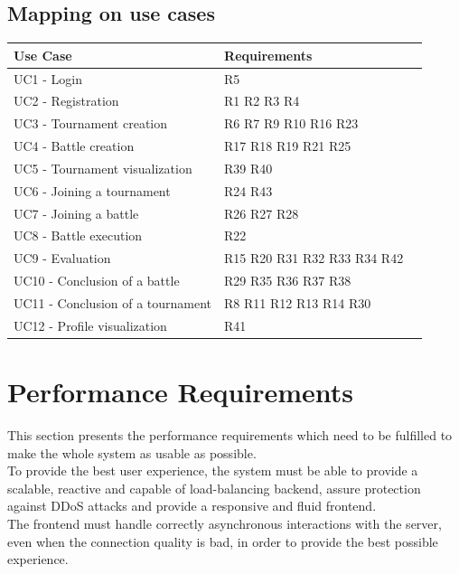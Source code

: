 \clearpage
\subsection{Mapping on use cases}
\begin{table}[H]
    \begin{tabularx}{\textwidth}{XXX}
        \toprule
        \textbf{Use Case}                     & \textbf{Requirements} \\ \midrule
        UC1 - Login                           & R5                   \\
        UC2 - Registration                    & R1 R2 R3 R4               \\
        UC3 - Tournament creation             & R6 R7 R9 R10 R16 R23  \\
        UC4 - Battle creation                 & R17 R18 R19 R21 R25       \\
        UC5 - Tournament visualization        & R39 R40          \\
        UC6 - Joining a tournament            & R24 R43        \\
        UC7 - Joining a battle                & R26 R27 R28      \\
        UC8 - Battle execution                & R22              \\
        UC9 - Evaluation                      & R15 R20 R31 R32 R33 R34 R42     \\
        UC10 - Conclusion of a battle         & R29 R35 R36 R37 R38         \\
        UC11 - Conclusion of a tournament     & R8 R11 R12 R13 R14 R30              \\
        UC12 - Profile visualization          & R41              \\
        \bottomrule
    \end{tabularx}
\end{table}

\clearpage
\section{Performance Requirements}
This section presents the performance requirements which need to be fulfilled to make the
whole system as usable as possible.\\
To provide the best user experience, the system must be able to provide a scalable, reactive 
and capable of load-balancing backend, assure protection against DDoS attacks and provide a 
responsive and fluid frontend.\\
The frontend must handle correctly asynchronous interactions with the server, even when the 
connection quality is bad, in order to provide the best possible experience.\\

